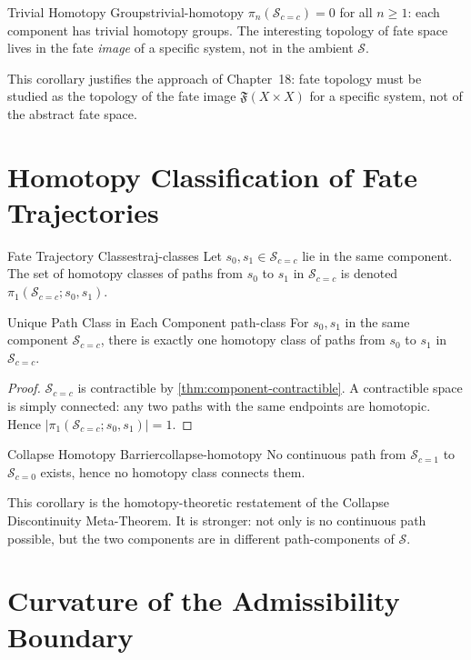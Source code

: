 \documentclass[12pt,twoside,openright]{book}
\newcommand{\distPairs}{X\times X}
\newcommand{\fateMap}{\mathfrak{F}}
\newcommand{\fateSpace}{\mathcal{S}}
\newcommand{\collapseInd}{c}             %
\newcommand{\fateComp}[1]{\fateSpace_{\collapseInd=#1}}
\providecommand{\fateComp}[1]{\fateSpace_{\collapseInd=#1}}
\begin{document}
\begin{corollary}{Trivial Homotopy Groups}{trivial-homotopy}
$\pi_n(\fateComp{c})=0$ for all $n\ge1$: each component
has trivial homotopy groups. The interesting topology of
fate space lives in the fate \emph{image} of a specific
system, not in the ambient $\fateSpace$.
\end{corollary}

This corollary justifies the approach of Chapter~18: fate
topology must be studied as the topology of the fate image
$\fateMap(\distPairs)$ for a specific system, not of the
abstract fate space.

\section{Homotopy Classification of Fate Trajectories}

\begin{definition}{Fate Trajectory Classes}{traj-classes}
Let $s_0,s_1\in\fateComp{c}$ lie in the same component.
The set of homotopy classes of paths from $s_0$ to $s_1$
in $\fateComp{c}$ is denoted $\pi_1(\fateComp{c};s_0,s_1)$.
\end{definition}

\begin{theorem}{Unique Path Class in Each Component}%
  {path-class}
For $s_0,s_1$ in the same component $\fateComp{c}$, there
is exactly one homotopy class of paths from $s_0$ to $s_1$
in $\fateComp{c}$.
\begin{proof}
$\fateComp{c}$ is contractible by
\cref{thm:component-contractible}. A contractible space is
simply connected: any two paths with the same endpoints are
homotopic. Hence $|\pi_1(\fateComp{c};s_0,s_1)|=1$.
\end{proof}
\end{theorem}

\begin{corollary}{Collapse Homotopy Barrier}{collapse-homotopy}
No continuous path from $\fateComp{1}$ to $\fateComp{0}$
exists, hence no homotopy class connects them.
\end{corollary}

This corollary is the homotopy-theoretic restatement of the
Collapse Discontinuity Meta-Theorem. It is stronger: not
only is no continuous path possible, but the two components
are in different path-components of $\fateSpace$.

\section{Curvature of the Admissibility Boundary}
\end{document}

